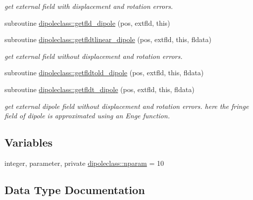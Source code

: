 \begin{DoxyCompactItemize}
\begin{DoxyCompactList}\small\item\em get external field with displacement and rotation errors. \end{DoxyCompactList}\item 
subroutine \mbox{\hyperlink{namespacedipoleclass_ac8c755e07904e113f223ee5ef029ac93}{dipoleclass\+::getfld\+\_\+dipole}} (pos, extfld, this)
\item 
subroutine \mbox{\hyperlink{namespacedipoleclass_a9913f632a53ea9454402dd0a7932d70a}{dipoleclass\+::getfldtlinear\+\_\+dipole}} (pos, extfld, this, fldata)
\begin{DoxyCompactList}\small\item\em get external field without displacement and rotation errors. \end{DoxyCompactList}\item 
subroutine \mbox{\hyperlink{namespacedipoleclass_a2897764d70f631133a41bf4ae8a1844a}{dipoleclass\+::getfldtold\+\_\+dipole}} (pos, extfld, this, fldata)
\item 
subroutine \mbox{\hyperlink{namespacedipoleclass_af86cd228552505ad1c64928bb918f500}{dipoleclass\+::getfldt\+\_\+dipole}} (pos, extfld, this, fldata)
\begin{DoxyCompactList}\small\item\em get external dipole field without displacement and rotation errors. here the fringe field of dipole is approximated using an Enge function. \end{DoxyCompactList}\end{DoxyCompactItemize}
\subsection*{Variables}
\begin{DoxyCompactItemize}
\item 
integer, parameter, private \mbox{\hyperlink{namespacedipoleclass_abc619199e1e9a2811da9e97630125da3}{dipoleclass\+::nparam}} = 10
\end{DoxyCompactItemize}


\subsection{Data Type Documentation}
\label{structdipoleclass_1_1dipole}
